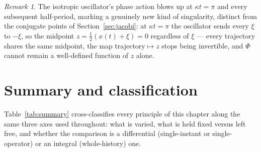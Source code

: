 \documentclass[11pt]{book}
\theoremstyle{definition}
\theoremstyle{plain}
\theoremstyle{remark}
\newtheorem{remark}[definition]{Remark}
\begin{document}
\begin{remark}
The isotropic oscillator's phase action blows up at $\kappa t=\pi$ and every subsequent half-period, marking a genuinely new kind of singularity, distinct from the conjugate points of Section~\ref{sec:jacobi}: at $\kappa t=\pi$ the oscillator sends every $\xi$ to $-\xi$, so the midpoint $z=\tfrac12(x(t)+\xi)=0$ regardless of $\xi$ --- every trajectory shares the same midpoint, the map trajectory$\mapsto z$ stops being invertible, and $\Phi$ cannot remain a well-defined function of $z$ alone.
\end{remark}

\section{Summary and classification}
\label{sec:summary}

Table~\ref{tab:summary} cross-classifies every principle of this chapter along the same three axes used throughout: what is varied, what is held fixed versus left free, and whether the comparison is a differential (single-instant or single-operator) or an integral (whole-history) one.
\end{document}
